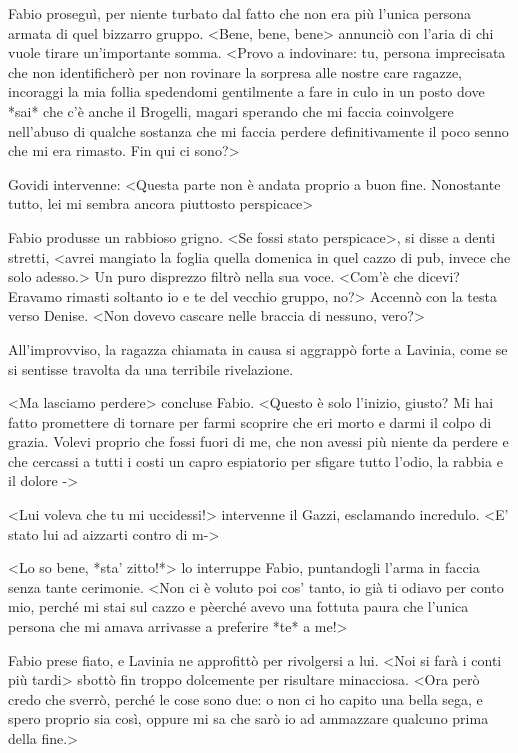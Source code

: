 Fabio proseguì, per niente turbato dal fatto che non era più l'unica persona armata di quel bizzarro gruppo. <Bene, bene, bene> annunciò con l'aria di chi vuole tirare un'importante somma. <Provo a indovinare: tu, persona imprecisata che non identificherò per non rovinare la sorpresa alle nostre care ragazze, incoraggi la mia follia spedendomi gentilmente a fare in culo in un posto dove *sai* che c'è anche il Brogelli, magari sperando che mi faccia coinvolgere nell'abuso di qualche sostanza che mi faccia perdere definitivamente il poco senno che mi era rimasto. Fin qui ci sono?>

Govidi intervenne: <Questa parte non è andata proprio a buon fine. Nonostante tutto, lei mi sembra ancora piuttosto perspicace>

Fabio produsse un rabbioso grigno. <Se fossi stato perspicace>, si disse a denti stretti, <avrei mangiato la foglia quella domenica in quel cazzo di pub, invece che solo adesso.> Un puro disprezzo filtrò nella sua voce. <Com'è che dicevi? Eravamo rimasti soltanto io e te del vecchio gruppo, no?> Accennò con la testa verso Denise. <Non dovevo cascare nelle braccia di nessuno, vero?>

All'improvviso, la ragazza chiamata in causa si aggrappò forte a Lavinia, come se si sentisse travolta da una terribile rivelazione.

<Ma lasciamo perdere> concluse Fabio. <Questo è solo l'inizio, giusto? Mi hai fatto promettere di tornare per farmi scoprire che eri morto e darmi il colpo di grazia. Volevi proprio che fossi fuori di me, che non avessi più niente da perdere e che cercassi a tutti i costi un capro espiatorio per sfigare tutto l'odio, la rabbia e il dolore ->

<Lui voleva che tu mi uccidessi!> intervenne il Gazzi, esclamando incredulo. <E' stato lui ad aizzarti contro di m->

<Lo so bene, *sta' zitto!*> lo interruppe Fabio, puntandogli l'arma in faccia senza tante cerimonie. <Non ci è voluto poi cos' tanto, io già ti odiavo per conto mio, perché mi stai sul cazzo e pèerché avevo una fottuta paura che l'unica persona che mi amava arrivasse a preferire *te* a me!>

Fabio prese fiato, e Lavinia ne approfittò per rivolgersi a lui. <Noi si farà i conti più tardi> sbottò fin troppo dolcemente per risultare minacciosa. <Ora però credo che sverrò, perché le cose sono due: o non ci ho capito una bella sega, e spero proprio sia così, oppure mi sa che sarò io ad ammazzare qualcuno prima della fine.>

